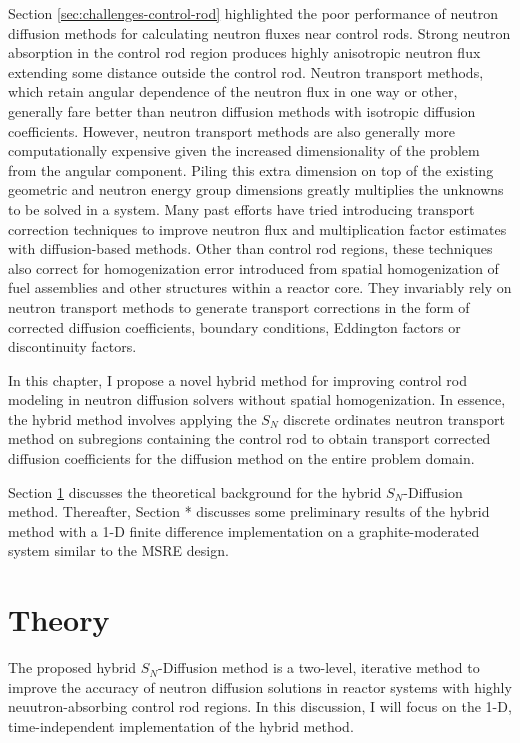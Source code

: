 Section \ref{sec:challenges-control-rod} highlighted the poor performance of neutron diffusion
methods for calculating neutron fluxes near control rods. Strong neutron absorption in the control
rod region produces highly anisotropic neutron flux extending some distance outside the control
rod. Neutron transport methods, which retain angular dependence of the neutron flux in one way or
other, generally fare better than neutron diffusion methods with isotropic diffusion coefficients.
However, neutron transport methods are also generally more computationally expensive given the
increased dimensionality of the problem from the angular component. Piling this extra dimension on
top of the existing geometric and neutron energy group dimensions greatly multiplies the unknowns
to be solved in a system. Many past efforts have tried introducing transport correction techniques
to improve neutron flux and multiplication factor estimates with diffusion-based methods. Other
than control rod regions, these techniques also correct for homogenization error introduced from
spatial homogenization of fuel assemblies and other structures within a reactor core. They
invariably rely on neutron transport methods to generate transport corrections in the form of
corrected diffusion coefficients, boundary conditions, Eddington factors or discontinuity factors.

In this chapter, I propose a novel hybrid method for improving control rod modeling in neutron
diffusion solvers without spatial homogenization. In essence, the hybrid method involves applying
the $S_N$ discrete ordinates neutron transport method on subregions containing the control rod to
obtain transport corrected diffusion coefficients for the diffusion method on the entire problem
domain. 

Section \ref{sec:hybrid-theory} discusses the theoretical background for the hybrid $S_N$-Diffusion
method. Thereafter, Section * discusses some preliminary results of the hybrid method with a 1-D
finite difference implementation on a graphite-moderated system similar to the \gls{MSRE} design.

\section{Theory} \label{sec:hybrid-theory}

The proposed hybrid $S_N$-Diffusion method is a two-level, iterative method to improve the
accuracy of neutron diffusion solutions in reactor systems with highly neuutron-absorbing control
rod regions. In this discussion, I will focus on the 1-D, time-independent implementation of the
hybrid method.

